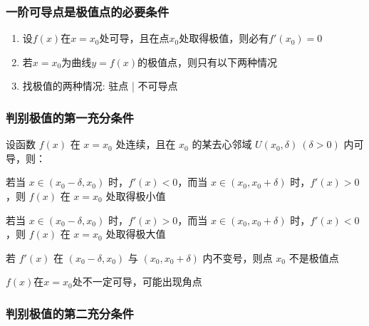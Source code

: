 \documentclass[a4paper,12pt]{article}
\begin{document}
    \subsubsection{一阶可导点是极值点的必要条件}

    \begin{enumerate}
        \item 设$f(x)$在$x = x_0$处可导，且在点$x_0$处取得极值，则必有$f'(x_0) = 0$
        \item 若$x = x_0$为曲线$y = f(x)$的极值点，则只有以下两种情况
        \item 找极值的两种情况: 驻点 | 不可导点
    \end{enumerate}

    \subsubsection{判别极值的第一充分条件}
    \begin{theorem}
        设函数 $f(x)$ 在 $x=x_0$ 处连续，且在 $x_0$ 的某去心邻域
        $U(x_0,\delta)\ (\delta>0)$ 内可导，则：

        \begin{circlenum}
            \item 若当 $x\in(x_0-\delta,x_0)$ 时，$f'(x)<0$，而当 $x\in(x_0,x_0+\delta)$ 时，$f'(x)>0$，则 $f(x)$ 在 $x=x_0$ 处取得极小值

            \item 若当 $x\in(x_0-\delta,x_0)$ 时，$f'(x)>0$，而当 $x\in(x_0,x_0+\delta)$ 时，$f'(x)<0$，则 $f(x)$ 在 $x=x_0$ 处取得极大值

            \item 若 $f'(x)$ 在 $(x_0-\delta,x_0)$ 与 $(x_0,x_0+\delta)$ 内不变号，则点 $x_0$ 不是极值点

            \item $f(x)$在$x = x_0$处不一定可导，可能出现角点
        \end{circlenum}
    \end{theorem}

    \subsubsection{判别极值的第二充分条件}
\end{document}
